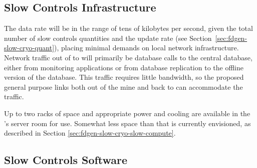 


\subsection{Slow Controls Infrastructure}
\label{sec:fdgen-slow-cryo-slow-infra}

The data rate will be in the range of tens of kilobytes per second, given the total number of slow controls quantities and the update rate  
(see Section~\ref{sec:fdgen-slow-cryo-quant}), placing minimal demands
on local network infrastructure.
Network traffic out of \surf to \fnal will primarily be database calls
to the central  database, either from monitoring applications or from
database replication to the offline version of the  database.  This
traffic requires little bandwidth, so the proposed general purpose
links both out of the mine and back to \fnal can accommodate the traffic.

Up to two racks of space and appropriate power and cooling are
available in the 's  server room for  use.
Somewhat less space than that is currently envisioned, as described in Section
\ref{sec:fdgen-slow-cryo-slow-compute}.

\subsection{Slow Controls Software}
\label{sec:fdgen-slow-cryo-sw}

